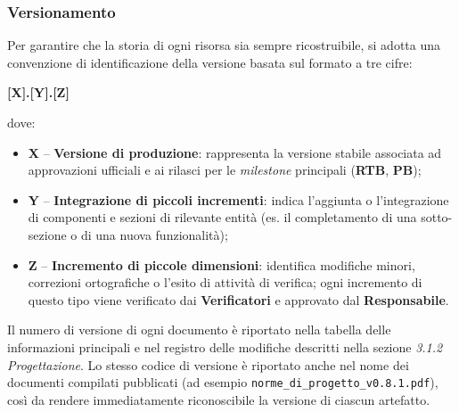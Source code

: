 \documentclass[12pt, a4paper]{article}
\begin{document}
\subsubsection{Versionamento}
Per garantire che la storia di ogni risorsa sia sempre ricostruibile, si adotta una convenzione di identificazione della versione basata sul formato a tre cifre:
\begin{center}
    \textbf{[X].[Y].[Z]}
\end{center}
dove:
\begin{itemize}
    \item \textbf{X} -- \textbf{Versione di produzione}: rappresenta la versione stabile associata ad approvazioni ufficiali e ai rilasci per le \textit{milestone} principali (\textbf{RTB}, \textbf{PB});
    \item \textbf{Y} -- \textbf{Integrazione di piccoli incrementi}: indica l'aggiunta o l'integrazione di componenti e sezioni di rilevante entità (es. il completamento di una sotto-sezione o di una nuova funzionalità);
    \item \textbf{Z} -- \textbf{Incremento di piccole dimensioni}: identifica modifiche minori, correzioni ortografiche o l'esito di attività di verifica; ogni incremento di questo tipo viene verificato dai \textbf{Verificatori} e approvato dal \textbf{Responsabile}.
\end{itemize}
Il numero di versione di ogni documento è riportato nella tabella delle informazioni principali e nel registro delle modifiche descritti nella sezione \textit{3.1.2 Progettazione}. Lo stesso codice di versione è riportato anche nel nome dei documenti compilati pubblicati (ad esempio \texttt{norme\_di\_progetto\_v0.8.1.pdf}), così da rendere immediatamente riconoscibile la versione di ciascun artefatto.
\end{document}
